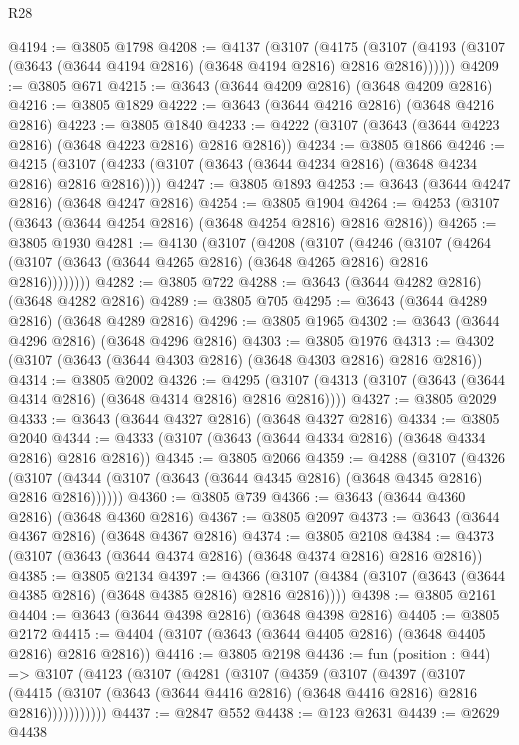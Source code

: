 \begin{lexlean}{R28}
\begin{coremodule}
@4194 := @3805 @1798
@4208 := @4137
    (@3107
      (@4175 (@3107 (@4193 (@3107 (@3643 (@3644 @4194 @2816) (@3648 @4194 @2816) @2816 @2816))))))
@4209 := @3805 @671
@4215 := @3643 (@3644 @4209 @2816) (@3648 @4209 @2816)
@4216 := @3805 @1829
@4222 := @3643 (@3644 @4216 @2816) (@3648 @4216 @2816)
@4223 := @3805 @1840
@4233 := @4222 (@3107 (@3643 (@3644 @4223 @2816) (@3648 @4223 @2816) @2816 @2816))
@4234 := @3805 @1866
@4246 := @4215 (@3107 (@4233 (@3107 (@3643 (@3644 @4234 @2816) (@3648 @4234 @2816) @2816 @2816))))
@4247 := @3805 @1893
@4253 := @3643 (@3644 @4247 @2816) (@3648 @4247 @2816)
@4254 := @3805 @1904
@4264 := @4253 (@3107 (@3643 (@3644 @4254 @2816) (@3648 @4254 @2816) @2816 @2816))
@4265 := @3805 @1930
@4281 := @4130
    (@3107
      (@4208
        (@3107
          (@4246
            (@3107 (@4264 (@3107 (@3643 (@3644 @4265 @2816) (@3648 @4265 @2816) @2816 @2816))))))))
@4282 := @3805 @722
@4288 := @3643 (@3644 @4282 @2816) (@3648 @4282 @2816)
@4289 := @3805 @705
@4295 := @3643 (@3644 @4289 @2816) (@3648 @4289 @2816)
@4296 := @3805 @1965
@4302 := @3643 (@3644 @4296 @2816) (@3648 @4296 @2816)
@4303 := @3805 @1976
@4313 := @4302 (@3107 (@3643 (@3644 @4303 @2816) (@3648 @4303 @2816) @2816 @2816))
@4314 := @3805 @2002
@4326 := @4295 (@3107 (@4313 (@3107 (@3643 (@3644 @4314 @2816) (@3648 @4314 @2816) @2816 @2816))))
@4327 := @3805 @2029
@4333 := @3643 (@3644 @4327 @2816) (@3648 @4327 @2816)
@4334 := @3805 @2040
@4344 := @4333 (@3107 (@3643 (@3644 @4334 @2816) (@3648 @4334 @2816) @2816 @2816))
@4345 := @3805 @2066
@4359 := @4288
    (@3107
      (@4326 (@3107 (@4344 (@3107 (@3643 (@3644 @4345 @2816) (@3648 @4345 @2816) @2816 @2816))))))
@4360 := @3805 @739
@4366 := @3643 (@3644 @4360 @2816) (@3648 @4360 @2816)
@4367 := @3805 @2097
@4373 := @3643 (@3644 @4367 @2816) (@3648 @4367 @2816)
@4374 := @3805 @2108
@4384 := @4373 (@3107 (@3643 (@3644 @4374 @2816) (@3648 @4374 @2816) @2816 @2816))
@4385 := @3805 @2134
@4397 := @4366 (@3107 (@4384 (@3107 (@3643 (@3644 @4385 @2816) (@3648 @4385 @2816) @2816 @2816))))
@4398 := @3805 @2161
@4404 := @3643 (@3644 @4398 @2816) (@3648 @4398 @2816)
@4405 := @3805 @2172
@4415 := @4404 (@3107 (@3643 (@3644 @4405 @2816) (@3648 @4405 @2816) @2816 @2816))
@4416 := @3805 @2198
@4436 := fun (position : @44) =>
  @3107
    (@4123
      (@3107
        (@4281
          (@3107
            (@4359
              (@3107
                (@4397
                  (@3107
                    (@4415
                      (@3107 (@3643 (@3644 @4416 @2816) (@3648 @4416 @2816) @2816 @2816)))))))))))
@4437 := @2847 @552
@4438 := @123 @2631
@4439 := @2629 @4438

\end{coremodule}
\end{lexlean}

